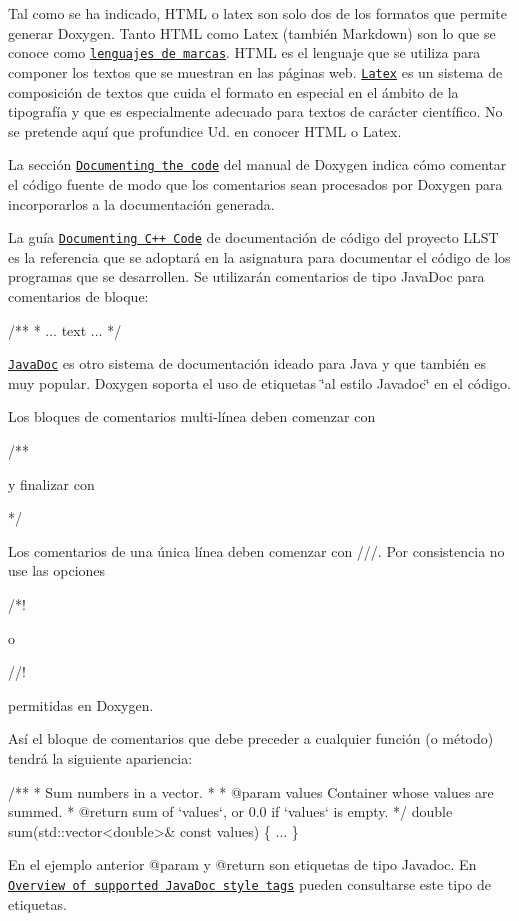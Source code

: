Tal como se ha indicado, H\+T\+ML o latex son solo dos de los formatos que permite generar Doxygen. Tanto H\+T\+ML como Latex (también Markdown) son lo que se conoce como \href{https://es.wikipedia.org/wiki/Lenguaje_de_marcado}{\tt lenguajes de marcas}. H\+T\+ML es el lenguaje que se utiliza para componer los textos que se muestran en las páginas web. \href{https://en.wikipedia.org/wiki/LaTeX}{\tt Latex} es un sistema de composición de textos que cuida el formato en especial en el ámbito de la tipografía y que es especialmente adecuado para textos de carácter científico. No se pretende aquí que profundice Ud. en conocer H\+T\+ML o Latex.

La sección \href{https://www.doxygen.nl/manual/config.html}{\tt Documenting the code} del manual de Doxygen indica cómo comentar el código fuente de modo que los comentarios sean procesados por Doxygen para incorporarlos a la documentación generada.

La guía \href{https://developer.lsst.io/cpp/api-docs.html}{\tt Documenting C++ Code} de documentación de código del proyecto L\+L\+ST es la referencia que se adoptará en la asignatura para documentar el código de los programas que se desarrollen. Se utilizarán comentarios de tipo Java\+Doc para comentarios de bloque\+:


\begin{DoxyCode}
/**
 * ... text ...
 */
\end{DoxyCode}
 \href{https://en.wikipedia.org/wiki/Javadoc}{\tt Java\+Doc} es otro sistema de documentación ideado para Java y que también es muy popular. Doxygen soporta el uso de etiquetas \char`\"{}al estilo Javadoc\char`\"{} en el código.

Los bloques de comentarios multi-\/línea deben comenzar con 
\begin{DoxyCode}
/** 
\end{DoxyCode}
 y finalizar con 
\begin{DoxyCode}
*/
\end{DoxyCode}
 Los comentarios de una única línea deben comenzar con {\ttfamily ///}. Por consistencia no use las opciones 
\begin{DoxyCode}
/*!
\end{DoxyCode}
 o 
\begin{DoxyCode}
//!
\end{DoxyCode}
 permitidas en Doxygen.

Así el bloque de comentarios que debe preceder a cualquier función (o método) tendrá la siguiente apariencia\+: 
\begin{DoxyCode}
/**
 * Sum numbers in a vector.
 *
 * @param values Container whose values are summed.
 * @return sum of `values`, or 0.0 if `values` is empty.
 */
double sum(std::vector<double>& const values) \{
  ...
\}
\end{DoxyCode}
 En el ejemplo anterior {\ttfamily @param} y {\ttfamily @return} son etiquetas de tipo Javadoc. En \href{http://www.time2help.com/doc/online_help/idh_java_doc_tag_support.htm}{\tt Overview of supported Java\+Doc style tags} pueden consultarse este tipo de etiquetas.

